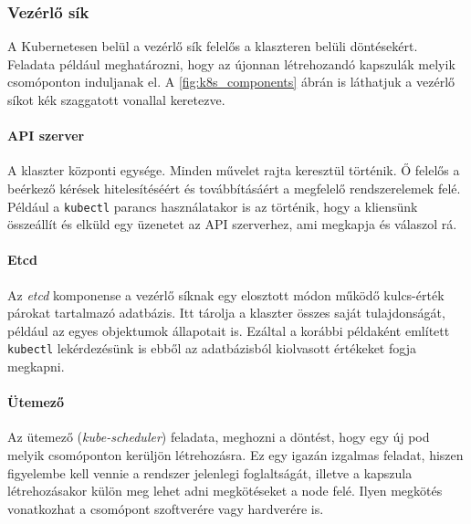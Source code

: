 \subsubsection{Vezérlő sík}
A Kubernetesen belül a vezérlő sík felelős a klaszteren belüli döntésekért. Feladata például meghatározni, hogy az újonnan létrehozandó kapszulák melyik csomóponton induljanak el. A \ref{fig:k8s_components} ábrán is láthatjuk a vezérlő síkot kék szaggatott vonallal keretezve.

\paragraph{API szerver} A klaszter központi egysége. Minden művelet rajta keresztül történik. Ő felelős a beérkező kérések hitelesítéséért és továbbításáért a megfelelő rendszerelemek felé. Például a \verb+kubectl+ parancs használatakor is az történik, hogy a kliensünk összeállít és elküld egy üzenetet az API szerverhez, ami megkapja és válaszol rá.

\paragraph{Etcd} Az \textit{etcd} komponense a vezérlő síknak egy elosztott módon működő\citep{raft} kulcs-érték párokat tartalmazó adatbázis. Itt tárolja a klaszter összes saját tulajdonságát, például az egyes objektumok állapotait is. Ezáltal a korábbi példaként említett \verb+kubectl+ lekérdezésünk is ebből az adatbázisból kiolvasott értékeket fogja megkapni.

\paragraph{Ütemező} Az ütemező (\textit{kube-scheduler}) feladata, meghozni a döntést, hogy egy új pod melyik csomóponton kerüljön létrehozásra. Ez egy igazán izgalmas feladat, hiszen figyelembe kell vennie a rendszer jelenlegi foglaltságát, illetve a kapszula létrehozásakor külön meg lehet adni megkötéseket a node felé. Ilyen megkötés vonatkozhat a csomópont szoftverére vagy hardverére is. 

